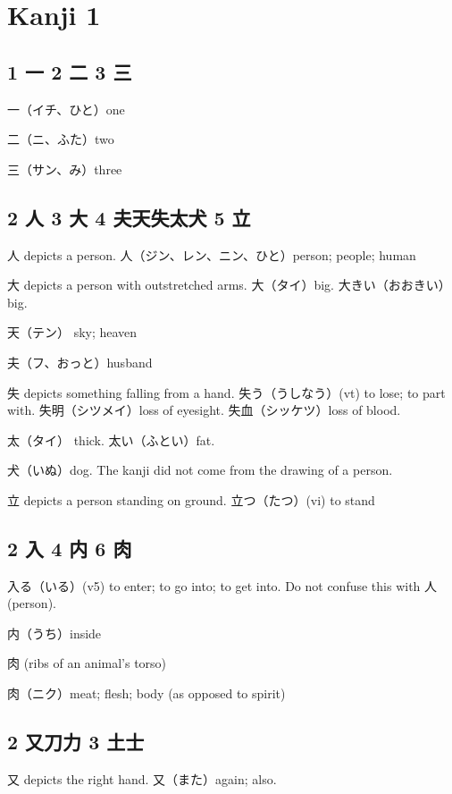 \chapter{Kanji 1}

\section{1 一 2 二 3 三}

一（イチ、ひと）one

二（ニ、ふた）two

三（サン、み）three

\section{2 人 3 大 4 夫天失太犬 5 立}

人 depicts a person.
人（ジン、レン、ニン、ひと）person; people; human

大 depicts a person with outstretched arms.
大（タイ）big.
大きい（おおきい）big.

天（テン） sky; heaven

夫（フ、おっと）husband

失 depicts something falling from a hand.
失う（うしなう）(vt) to lose; to part with.
失明（シツメイ）loss of eyesight.
失血（シッケツ）loss of blood.

太（タイ） thick.
太い（ふとい）fat.

犬（いぬ）dog.
The kanji did not come
from the drawing of a person.

立 depicts a person standing on ground.
立つ（たつ）(vi) to stand

\section{2 入 4 内 6 肉}

入る（いる）(v5)
to enter; to go into; to get into.
Do not confuse this with 人(person).

内（うち）inside

肉 (ribs of an animal's torso)

肉（ニク）meat; flesh; body (as opposed to spirit)

\section{2 又刀力 3 土士}

又 depicts the right hand.
又（また）again; also.

